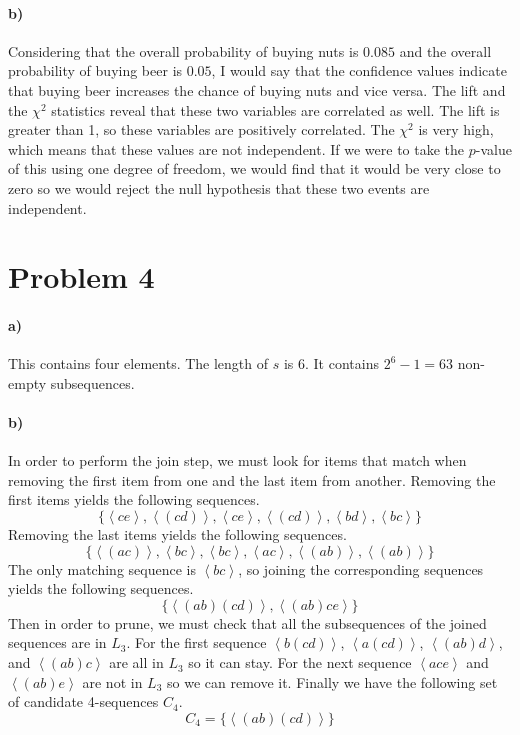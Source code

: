 \documentclass[12pt]{article}
\begin{document}
\paragraph{b)}

Considering that the overall probability of buying nuts is \(0.085\) and the overall probability of buying beer
is \(0.05\), I would say that the confidence values indicate that buying beer increases the chance of buying nuts and vice
versa. The lift and the \(\chi^2\) statistics reveal that these two variables are correlated as well. The lift is
greater than 1, so these variables are positively correlated. The \(\chi^2\) is very high, which means that these values
are not independent. If we were to take the \(p\)-value of this using one degree of freedom, we would find that it
would be very close to zero so we would reject the null hypothesis that these two events are independent.

\section*{Problem 4}

\paragraph{a)}

This contains four elements. The length of \(s\) is 6. It contains \(2^6-1=63\) non-empty subsequences.

\paragraph{b)}

In order to perform the join step, we must look for items that match when removing the first item from one
and the last item from another. Removing the first items yields the following sequences.
\[\{\left<ce\right>,\left<(cd)\right>,\left<ce\right>,\left<(cd)\right>,\left<bd\right>,\left<bc\right>\}\]
Removing the last items yields the following sequences.
\[\{\left<(ac)\right>,\left<bc\right>,\left<bc\right>,\left<ac\right>,\left<(ab)\right>,\left<(ab)\right>\}\]
The only matching sequence is \(\left<bc\right>\), so joining the corresponding sequences yields the following
sequences.
\[\{\left<(ab)(cd)\right>,\left<(ab)ce\right>\}\]
Then in order to prune, we must check that all the subsequences of the joined sequences are in \(L_3\). For
the first sequence \(\left<b(cd)\right>\), \(\left<a(cd)\right>\), \(\left<(ab)d\right>\), and \(\left<(ab)c\right>\)
are all in \(L_3\) so it can stay. For the next sequence \(\left<ace\right>\) and \(\left<(ab)e\right>\) are not
in \(L_3\) so we can remove it. Finally we have the following set of candidate 4-sequences \(C_4\).
\[C_4=\{\left<(ab)(cd)\right>\}\]
\end{document}
